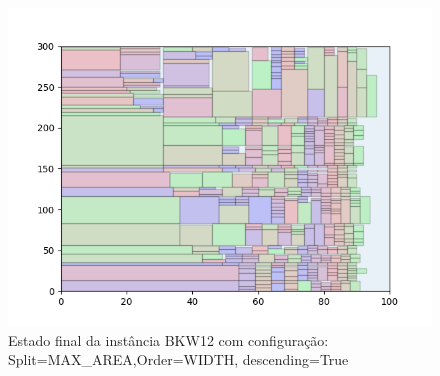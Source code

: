 \begin{figure}[H]
    \centering
    \caption[]{Estado final da instância BKW12 com configuração: Split=MAX_AREA,Order=WIDTH, descending=True}
    \label{fig:bkw12-max_area-width-true}
    \includegraphics[scale=0.5]{output/figures/bkw/bkw12/max_area/width/true/000}
\end{figure}